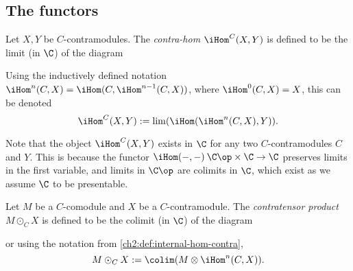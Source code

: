 
\subsection{The functors}



\begin{definition}
    Let $X, Y$ be $C$-contramodules. The \emph{contra-hom} $\iHom^C(X, Y)$ is defined to be the limit (in $\C$) of the diagram 
    \begin{center}
    \end{center}
    Using the inductively defined notation $\iHom^n(C, X) = \iHom(C, \iHom^{n-1}(C, X))$, where $\iHom^0(C, X) = X$, this can be denoted 
    \[\iHom^C(X, Y) := \lim(\iHom(\iHom^n(C, X), Y)).\]
\end{definition}

\begin{remark}
    Note that the object $\iHom^C(X, Y)$ exists in $\C$ for any two $C$-contramodules $C$ and $Y$. This is because the functor $\iHom(-,-)\: \C\op\times \C\to \C$ preserves limits in the first variable, and limits in $\C\op$ are colimits in $\C$, which exist as we assume $\C$ to be presentable. 
\end{remark}

\begin{definition}
    Let $M$ be a $C$-comodule and $X$ be a $C$-contramodule. The \emph{contratensor product} $M\odot_C X$ is defined to be the colimit (in $\C$) of the diagram 
    \begin{center}
    \end{center}
    or using the notation from \cref{ch2:def:internal-hom-contra}, 
    \[M\odot_C X := \colim(M\otimes \iHom^n(C, X)).\]
\end{definition}

